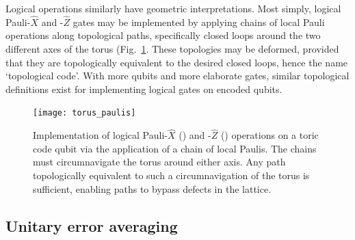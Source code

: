 Logical operations similarly have geometric interpretations. Most simply, logical Pauli-$\hat{X}$ and -$\hat{Z}$ gates may be implemented by applying chains of local Pauli operations along topological paths, specifically closed loops around the two different axes of the torus (Fig.~\ref{fig:toric_code_paulis}. These topologies may be deformed, provided that they are topologically equivalent to the desired closed loops, hence the name `topological code'. With more qubits and more elaborate gates, similar topological definitions exist for implementing logical gates on encoded qubits.

\begin{figure}[!htbp]
	\texttt{[image: torus\_paulis]}
	\captionspacefig \caption{Implementation of logical Pauli-$\hat{X}$ () and -$\hat{Z}$ () operations on a toric code qubit via the application of a chain of local Paulis. The chains must circumnavigate the torus around either axis. Any path topologically equivalent to such a circumnavigation of the torus is sufficient, enabling paths to bypass defects in the lattice.} \label{fig:toric_code_paulis}
\end{figure}









%
%

\subsection{Unitary error averaging} \label{sec:error_averaging}

